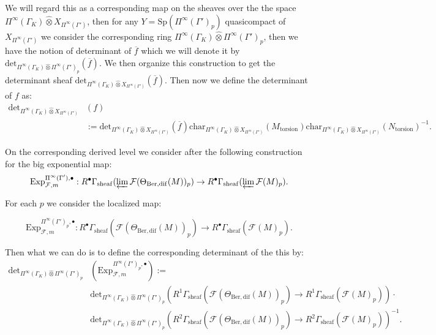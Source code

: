 \documentclass[12pt]{amsart}
\theoremstyle{definition}
\numberwithin{equation}{section}
\begin{document}
We will regard this as a corresponding map on the sheaves over the the space $\Pi^\infty(\Gamma_K)\widehat{\otimes}X_{\Pi^\infty(\Gamma')}$, then for any $Y=\mathrm{Sp}(\Pi^\infty(\Gamma')_p)$ quasicompact of $X_{\Pi^\infty(\Gamma')}$ we consider the corresponding ring $\Pi^\infty(\Gamma_K)\widehat{\otimes}\Pi^\infty(\Gamma')_p$, then we have the notion of determinant of $\overline{f}$ which we will denote it by $\mathrm{det}_{\Pi^\infty(\Gamma_K)\widehat{\otimes}\Pi^\infty(\Gamma')_p}(\overline{f})$. We then organize this construction to get the determinant sheaf $\mathrm{det}_{\Pi^\infty(\Gamma_K)\widehat{\otimes}X_{\Pi^\infty(\Gamma')}}(\overline{f})$. Then now we define the determinant of $f$ as:
\begin{align}
\mathrm{det}_{\Pi^\infty(\Gamma_K)\widehat{\otimes}X_{\Pi^\infty(\Gamma')}}&(f)\\
&:=\mathrm{det}_{\Pi^\infty(\Gamma_K)\widehat{\otimes}X_{\Pi^\infty(\Gamma')}}(\overline{f})\mathrm{char}_{\Pi^\infty(\Gamma_K)\widehat{\otimes}X_{\Pi^\infty(\Gamma')}}(M_\mathrm{torsion})\mathrm{char}_{\Pi^\infty(\Gamma_K)\widehat{\otimes}X_{\Pi^\infty(\Gamma')}}(N_\mathrm{torsion})^{-1}.	
\end{align}

\indent On the corresponding derived level we consider after \cite[Section 3.4]{Nakamura1} the following construction for the big exponential map:
\begin{displaymath}
\mathrm{Exp}^{\Pi^\infty(\Gamma'),\bullet}_{\mathcal{F},m}: R^\bullet\Gamma_\mathrm{sheaf}(\varprojlim\mathcal{F}(\Theta_{\mathrm{Ber,dif}}(M))_p) \rightarrow R^\bullet\Gamma_\mathrm{sheaf}(\varprojlim\mathcal{F}(M)_p).
\end{displaymath}

For each $p$ we consider the localized map:

\begin{displaymath}
\mathrm{Exp}^{\Pi^\infty(\Gamma')_p,\bullet}_{\mathcal{F},m}: R^\bullet\Gamma_\mathrm{sheaf}(\mathcal{F}(\Theta_{\mathrm{Ber,dif}}(M))_p) \rightarrow R^\bullet\Gamma_\mathrm{sheaf}(\mathcal{F}(M)_p).
\end{displaymath}

Then what we can do is to define the corresponding determinant of the this by:
\begin{align}
\mathrm{det}_{\Pi^\infty(\Gamma_K)\widehat{\otimes}\Pi^\infty(\Gamma')_p}&(\mathrm{Exp}^{\Pi^\infty(\Gamma')_p,\bullet}_{\mathcal{F},m}):=	\\
& \mathrm{det}_{\Pi^\infty(\Gamma_K)\widehat{\otimes}\Pi^\infty(\Gamma')_p}(R^1\Gamma_\mathrm{sheaf}(\mathcal{F}(\Theta_{\mathrm{Ber,dif}}(M))_p) \rightarrow R^1\Gamma_\mathrm{sheaf}(\mathcal{F}(M)_p))\cdot\\
&\mathrm{det}_{\Pi^\infty(\Gamma_K)\widehat{\otimes}\Pi^\infty(\Gamma')_p}(R^2\Gamma_\mathrm{sheaf}(\mathcal{F}(\Theta_{\mathrm{Ber,dif}}(M))_p) \rightarrow R^2\Gamma_\mathrm{sheaf}(\mathcal{F}(M)_p))^{-1}.
\end{align}
\end{document}
